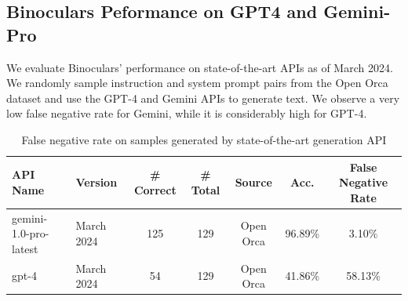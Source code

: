 \documentclass{article} %
\begin{document}
\subsection{Binoculars Peformance on GPT4 and Gemini-Pro}

We evaluate Binoculars' performance on state-of-the-art APIs as of March 2024. We randomly sample instruction and system prompt pairs from the Open Orca dataset and use the GPT-4 and Gemini APIs to generate text. We observe a very low false negative rate for Gemini, while it is considerably high for GPT-4.

\begin{table}[!ht]
\caption{False negative rate on samples generated by state-of-the-art generation API}
\vspace{2pt}
\centering
\footnotesize
\begin{tabular}{llccccc}
\toprule
    API Name & Version & \# Correct& \# Total & Source & Acc. & False Negative Rate \\
    \midrule
    gemini-1.0-pro-latest & March 2024 & 125 & 129 & Open Orca & 96.89\% & 3.10\% 
    \\
    gpt-4 & March 2024 & 54 & 129 & Open Orca & 41.86\% & 58.13\% \\ \bottomrule
\end{tabular}
\end{table}
\end{document}
